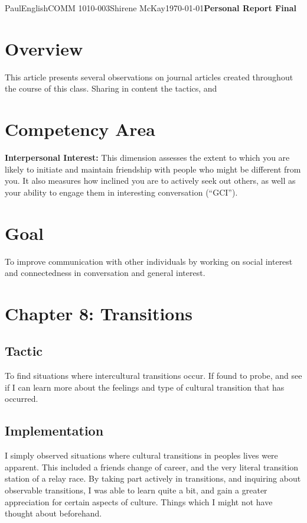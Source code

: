 \documentclass[12pt,letterpaper]{article}
\begin{document}
\begin{mla}{Paul}{English}{COMM 1010-003}{Shirene
    McKay}{\today}{\textbf{Personal Report Final}}

\section{Overview}

This article presents several observations on journal articles created throughout the course of this class. Sharing in content the tactics, and 

\section{Competency Area}

\textbf{Interpersonal Interest:} This dimension assesses the extent to which
you are likely to initiate and maintain friendship with people who
might be different from you. It also measures how inclined you are to
actively seek out others, as well as your ability to engage them in
interesting conversation (``GCI'').

\section{Goal}

To improve communication with other individuals by working on social interest and connectedness in conversation and general interest.

\section{Chapter 8: Transitions}

\subsection{Tactic}

To find situations where intercultural transitions occur. If found to probe, and see if I can learn more about the feelings and type of cultural transition that has occurred.

\subsection{Implementation}

I simply observed situations where cultural transitions in peoples lives were apparent. This included a friends change of career, and the very literal transition station of a relay race. By taking part actively in transitions, and inquiring about observable transitions, I was able to learn quite a bit, and gain a greater appreciation for certain aspects of culture. Things which I might not have thought about beforehand.


\end{mla}
\end{document}
